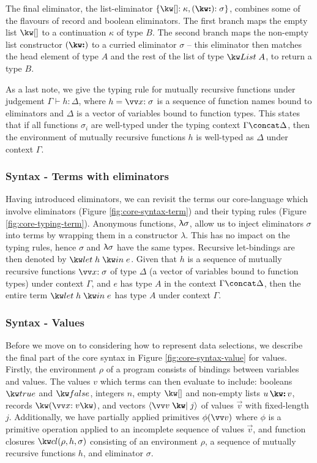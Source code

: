 The final eliminator, the list-eliminator $\elimList{\kappa}{\sigma}$, combines some of the flavours of record and boolean eliminators. The first branch maps the empty list $\exNil$ to a continuation $\kappa$ of type $B$. The second branch maps the non-empty list constructor $(\symCons)$ to a curried eliminator $\sigma$ -- this eliminator then matches the head element of type $A$ and the rest of the list of type $\tyList{A}$, to return a type $B$.

As a last note, we give the typing rule for mutually recursive functions under judgement $\Gamma \vdash h: \Delta$, where $h = \vec{\bind{x}{\sigma}}$ is a sequence of function names bound to eliminators and $\Delta$ is a vector of variables bound to function types. This states that if all functions $\sigma_i$ are well-typed under the typing context $\Gamma \concat \Delta$, then the environment of mutually recursive functions $h$ is well-typed as $\Delta$ under context $\Gamma$.

\subsubsection{Syntax - Terms with eliminators}
\label{sssec:syntax-eliminator-terms}
Having introduced eliminators, we can revisit the terms our core-language which involve eliminators (Figure \ref{fig:core-syntax-term}) and their typing rules (Figure \ref{fig:core-typing-term}). Anonymous functions, $\uplambda{\sigma}$, allow us to inject eliminators $\sigma$ into terms by wrapping them in a constructor $\lambda$. This has no impact on the typing rules, hence $\sigma$ and $\uplambda{\sigma}$ have the same types. Recursive let-bindings are then denoted by $\exLetRecMutual{h}{e}$. Given that $h$ is a sequence of mutually recursive functions $\vec{\bind{x}{\sigma}}$ of type $\Delta$ (a vector of variables bound to function types) under context $\Gamma$, and $e$ has type $A$ in the context $\Gamma \concat \Delta$, then the entire term $\exLetRecMutual{h}{e}$ has type $A$ under context $\Gamma$. 

\subsubsection{Syntax - Values}
Before we move on to considering how to represent data selections, we describe the final part of the core syntax in Figure \ref{fig:core-syntax-value} for values. Firstly, the environment $\rho$ of a program consists of bindings between variables and values. The values $v$ which terms can then evaluate to include: booleans $\exTrue$ and $\exFalse$, integers $n$, empty $\exNil$ and non-empty lists $\exCons{u}{v}$, records $\exRec{\vec{\bind{x}{v}}}$, and vectors $\exVecVal{\vec{v}}{j}$ of values $\vec{v}$ with fixed-length $j$. Additionally, we have partially applied primitives $\exPrimOp{\phi}{\vec{v}}$ where $\phi$ is a primitive operation applied to an incomplete sequence of values $\vec{v}$, and function closures $\exClosure{\rho}{h}{\sigma}$ consisting of an environment $\rho$, a sequence of mutually recursive functions $h$, and eliminator $\sigma$. 


